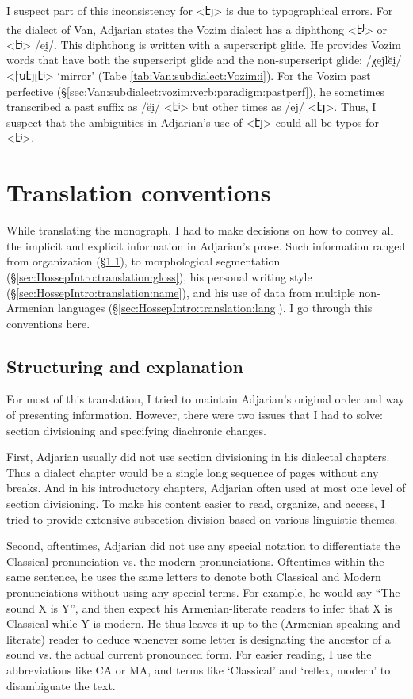 I suspect part of this inconsistency for <էյ> is due to typographical errors. For the dialect of Van, Adjarian states the Vozim dialect has a diphthong <է\textsuperscript{յ}> or <էʲ> /ei̯/. This diphthong is written with a superscript glide. He provides Vozim words that have both the superscript glide and the non-superscript glide: /χejlĕi̯/ <խէյլէʲ> `mirror' (Tabe \ref{tab:Van:subdialect:Vozim:i}).   For the Vozim past perfective (\S\ref{sec:Van:subdialect:vozim:verb:paradigm:pastperf}), he sometimes transcribed a past suffix as /ĕi̯/ <էʲ> but other times as /ej/ <էյ>. Thus, I suspect that the ambiguities in Adjarian's use of <էյ> could all be typos for <էʲ>. 


 

\section{Translation conventions}\label{sec:HossepIntro:translation}
While translating the monograph, I had to make decisions on how to convey all the implicit and explicit information in Adjarian's prose. Such information ranged from organization (\S\ref{sec:HossepIntro:translation:exp}), to morphological segmentation (\S\ref{sec:HossepIntro:translation:gloss}),   his personal writing style (\S\ref{sec:HossepIntro:translation:name}), and his use of data from multiple non-Armenian languages (\S\ref{sec:HossepIntro:translation:lang}). I go through this conventions here. 
\subsection{Structuring and explanation}\label{sec:HossepIntro:translation:exp}
For most of this translation, I tried to maintain Adjarian's original order and way of presenting information. However, there were two issues that I had to solve: section divisioning and specifying diachronic changes. 


First, Adjarian usually did not use section divisioning in his dialectal chapters. Thus a dialect chapter would be a single long sequence of pages without any breaks. And in his introductory chapters, Adjarian often used at most one level of section divisioning. To make his content easier to read, organize, and access, I tried to provide extensive subsection division based on various linguistic themes. 

Second,  oftentimes, Adjarian did not use any special notation to differentiate the Classical pronunciation vs. the modern pronunciations. Oftentimes within the same sentence, he uses the same letters to denote both Classical and Modern pronunciations without using any special terms. For example, he would say  ``The sound X is Y'', and then expect his Armenian-literate readers to  infer that X is Classical while Y is modern. He thus leaves it up to the (Armenian-speaking and literate) reader to deduce whenever some letter is designating the ancestor of a sound vs. the actual current pronounced form. 	For easier reading, I use the abbreviations like CA or MA, and terms like `Classical' and `reflex, modern' to disambiguate the text.   


